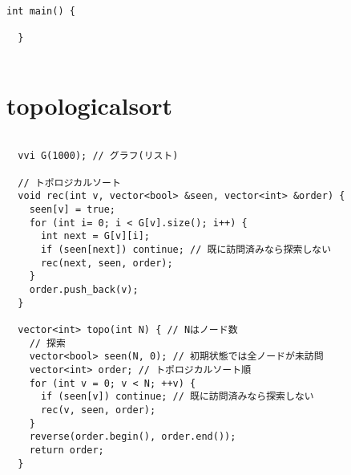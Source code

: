 \documentclass{jsarticle}
\begin{document}
\begin{lstlisting}[caption=templete]
  int main() {
    
  }
  

\end{lstlisting}

\color{white}
\section{topologicalsort}
\color{black}
\begin{lstlisting}[caption=topologicalsort]

  vvi G(1000); // グラフ(リスト)
  
  // トポロジカルソート
  void rec(int v, vector<bool> &seen, vector<int> &order) {
    seen[v] = true;
    for (int i= 0; i < G[v].size(); i++) {
      int next = G[v][i];
      if (seen[next]) continue; // 既に訪問済みなら探索しない
      rec(next, seen, order);
    }
    order.push_back(v);
  }
  
  vector<int> topo(int N) { // Nはノード数
    // 探索
    vector<bool> seen(N, 0); // 初期状態では全ノードが未訪問
    vector<int> order; // トポロジカルソート順
    for (int v = 0; v < N; ++v) {
      if (seen[v]) continue; // 既に訪問済みなら探索しない
      rec(v, seen, order);
    }
    reverse(order.begin(), order.end());
    return order;
  }
  

\end{lstlisting}

\color{white}
\end{document}
